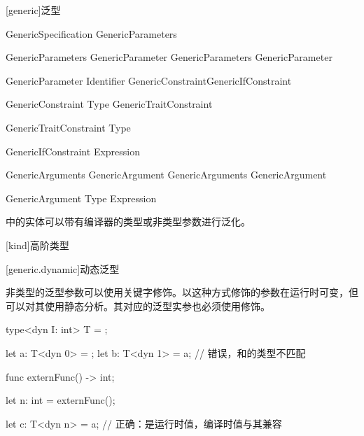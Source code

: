 
[generic]{泛型}

\begin{bnf}{GenericSpecification}
    \terminal{<} GenericParameters \terminal{>}
\end{bnf}

\begin{bnf}{GenericParameters}
    GenericParameter \br
    GenericParameters \terminal{,} GenericParameter
\end{bnf}

\begin{bnf}{GenericParameter}
    \bnfq Identifier \bnfq GenericConstraint\bnfq GenericIfConstraint\bnfq
\end{bnf}

\begin{bnf}{GenericConstraint}
    \terminal{:}  \br
    \terminal{:} Type \br
    GenericTraitConstraint
\end{bnf}

\begin{bnf}{GenericTraitConstraint}
     Type
\end{bnf}

\begin{bnf}{GenericIfConstraint}
     Expression
\end{bnf}

\begin{bnf}{GenericArguments}
    GenericArgument \br
    GenericArguments \terminal{,} GenericArgument
\end{bnf}

\begin{bnf}{GenericArgument}
    Type \br
    \bnfq Expression \br
     \terminal{_}
\end{bnf}

\pnum
\X 中的实体可以带有编译器的类型或非类型参数进行泛化。

[kind]{高阶类型}

[generic.dynamic]{动态泛型}

\pnum
非类型的泛型参数可以使用关键字修饰。以这种方式修饰的参数在运行时可变，但可以对其使用静态分析。其对应的泛型实参也必须使用修饰。

\enterexample
\begin{codeblock}

type<dyn I: int> T = { };

let a: T<dyn 0> = { };
let b: T<dyn 1> = a; // 错误，和的类型不匹配

func externFunc() -> int;

let n: int = externFunc();

let c: T<dyn n> = a; // 正确：是运行时值，编译时值与其兼容

\end{codeblock}
\exitexample

